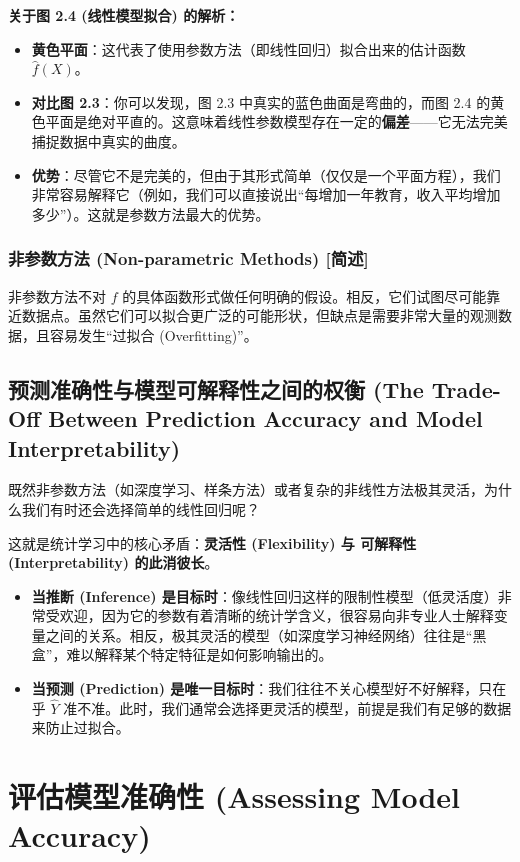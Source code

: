 \documentclass[UTF8]{ctexart}
\numberwithin{equation}{section}
\begin{document}
\textbf{关于图 2.4 (线性模型拟合) 的解析：}
\begin{itemize}
    \item \textbf{黄色平面}：这代表了使用参数方法（即线性回归）拟合出来的估计函数 $\hat{f}(X)$。
    \item \textbf{对比图 2.3}：你可以发现，图 2.3 中真实的蓝色曲面是弯曲的，而图 2.4 的黄色平面是绝对平直的。这意味着线性参数模型存在一定的\textbf{偏差}——它无法完美捕捉数据中真实的曲度。
    \item \textbf{优势}：尽管它不是完美的，但由于其形式简单（仅仅是一个平面方程），我们非常容易解释它（例如，我们可以直接说出“每增加一年教育，收入平均增加多少”）。这就是参数方法最大的优势。
\end{itemize}

\subsubsection{非参数方法 (Non-parametric Methods) [简述]}
非参数方法不对 $f$ 的具体函数形式做任何明确的假设。相反，它们试图尽可能靠近数据点。虽然它们可以拟合更广泛的可能形状，但缺点是需要非常大量的观测数据，且容易发生“过拟合 (Overfitting)”。

\subsection{预测准确性与模型可解释性之间的权衡 (The Trade-Off Between Prediction Accuracy and Model Interpretability)}

既然非参数方法（如深度学习、样条方法）或者复杂的非线性方法极其灵活，为什么我们有时还会选择简单的线性回归呢？

这就是统计学习中的核心矛盾：\textbf{灵活性 (Flexibility) 与 可解释性 (Interpretability) 的此消彼长}。
\begin{itemize}
    \item \textbf{当推断 (Inference) 是目标时}：像线性回归这样的限制性模型（低灵活度）非常受欢迎，因为它的参数有着清晰的统计学含义，很容易向非专业人士解释变量之间的关系。相反，极其灵活的模型（如深度学习神经网络）往往是“黑盒”，难以解释某个特定特征是如何影响输出的。
    \item \textbf{当预测 (Prediction) 是唯一目标时}：我们往往不关心模型好不好解释，只在乎 $\hat{Y}$ 准不准。此时，我们通常会选择更灵活的模型，前提是我们有足够的数据来防止过拟合。
\end{itemize}




\section{评估模型准确性 (Assessing Model Accuracy)}
\end{document}
